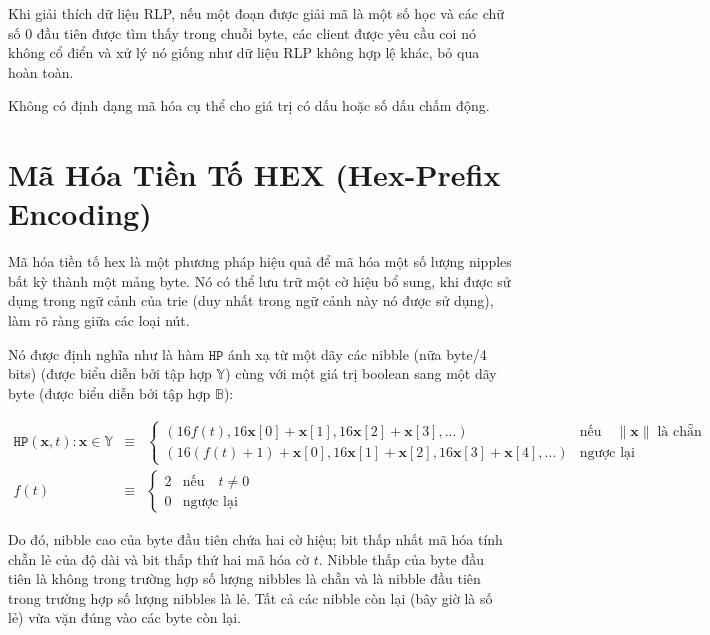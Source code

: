\documentclass[9pt,oneside]{amsart}
\makeatletter
\newcommand{\linkdest}[1]{\Hy@raisedlink{\hypertarget{#1}{}}}
\makeatother
\begin{document}
Khi giải thích dữ liệu RLP, nếu một đoạn được giải mã là một số học và các chữ số 0 đầu tiên được tìm thấy trong chuỗi byte, các client được yêu cầu coi nó không cổ điển và xử lý nó giống như dữ liệu RLP không hợp lệ khác, bỏ qua hoàn toàn.

Không có định dạng mã hóa cụ thể cho giá trị có dấu hoặc số dấu chấm động.

\section{Mã Hóa Tiền Tố HEX (Hex-Prefix Encoding)}\label{app:hexprefix}
Mã hóa tiền tố hex là một phương pháp hiệu quả để mã hóa một số lượng nipples bất kỳ thành một mảng byte. Nó có thể lưu trữ một cờ hiệu bổ sung, khi được sử dụng trong ngữ cảnh của trie (duy nhất trong ngữ cảnh này nó được sử dụng), làm rõ ràng giữa các loại nút.

Nó được định nghĩa như là hàm $\mathtt{HP}$ ánh xạ từ một dãy các nibble (nữa byte/4 bits) (được biểu diễn bởi tập hợp \linkdest{set_of_sequence_of_nibbles}$\mathbb{Y}$) cùng với một giá trị boolean sang một dãy byte (được biểu diễn bởi tập hợp $\mathbb{B}$):

\begin{eqnarray}
\mathtt{HP}(\mathbf{x}, t): \mathbf{x} \in \mathbb{Y} & \equiv & \begin{cases}
(16f(t), 16\mathbf{x}[0] + \mathbf{x}[1], 16\mathbf{x}[2] + \mathbf{x}[3], ...) &
\text{nếu} \quad \lVert \mathbf{x} \rVert \; \text{là chẵn} \\
(16(f(t) + 1) + \mathbf{x}[0], 16\mathbf{x}[1] + \mathbf{x}[2], 16\mathbf{x}[3] + \mathbf{x}[4], ...) &
\text{ngược lại}
\end{cases} \\
f(t) & \equiv & \begin{cases} 2 & \text{nếu} \quad t \neq 0 \\ 0 & \text{ngược lại} \end{cases}
\end{eqnarray}

Do đó, nibble cao của byte đầu tiên chứa hai cờ hiệu; bit thấp nhất mã hóa tính chẵn lẻ của độ dài và bit thấp thứ hai mã hóa cờ $t$. Nibble thấp của byte đầu tiên là không trong trường hợp số lượng nibbles là chẵn và là nibble đầu tiên trong trường hợp số lượng nibbles là lẻ. Tất cả các nibble còn lại (bây giờ là số lẻ) vừa vặn đúng vào các byte còn lại.
\end{document}
